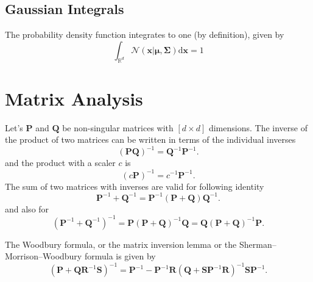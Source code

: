 \subsection{Gaussian Integrals}
The probability density function integrates to one (by definition), given by
\begin{equation}\label{eq:gaussian_int}
	\int_{\mathbb{R}^d}\mathcal{N}\left(\textbf{x}|\boldsymbol{\mu},\boldsymbol{\Sigma}\right)\text{d}\textbf{x}=1
\end{equation}

\section{Matrix Analysis}\label{app_mat_analysis}
Let's $\textbf{P}$ and $\textbf{Q}$ be non-singular matrices with $\left[d\times d\right]$ dimensions. The inverse of the product of two matrices can be written in terms of the individual inverses
\begin{equation}\label{eq:indv_invVec}
	\left(\textbf{P}\textbf{Q}\right)^{-1}=\textbf{Q}^{-1}\textbf{P}^{-1}.
\end{equation}
and the product with a scaler $c$ is
\begin{equation}\label{eq:indv_invVec}
	\left(c\textbf{P}\right)^{-1}=c^{-1}\textbf{P}^{-1}. 
\end{equation}
The sum of two matrices with inverses are valid for following identity
\begin{equation}\label{eq:inv_matsum1}
	\textbf{P}^{-1}+\textbf{Q}^{-1}=\textbf{P}^{-1}\left(\textbf{P}+\textbf{Q}\right)\textbf{Q}^{-1}.
\end{equation}
and also for 
\begin{equation}\label{eq:inv_matsum2}
	\left(\textbf{P}^{-1}+\textbf{Q}^{-1}\right)^{-1}=\textbf{P}\left(\textbf{P}+\textbf{Q}\right)^{-1}\textbf{Q}=\textbf{Q}\left(\textbf{P}+\textbf{Q}\right)^{-1}\textbf{P}.
\end{equation}

The Woodbury formula, or the matrix inversion lemma  or the Sherman–Morrison–Woodbury formula is given by
\begin{equation}\label{eq:Woodbury}
	\left(\textbf{P}+\textbf{Q}\textbf{R}^{-1}\textbf{S}\right)^{-1}=\textbf{P}^{-1}-\textbf{P}^{-1}\textbf{R}\left(\textbf{Q}+\textbf{S}\textbf{P}^{-1}\textbf{R}\right)^{-1}\textbf{S}\textbf{P}^{-1}.
\end{equation}

